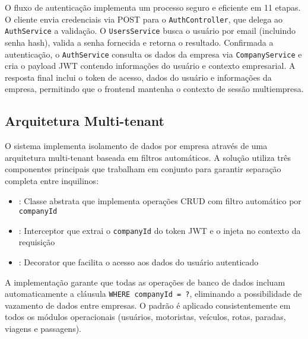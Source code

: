 O fluxo de autenticação implementa um processo seguro e eficiente em 11 etapas. O cliente envia credenciais via POST para o \texttt{AuthController}, que delega ao \texttt{AuthService} a validação. O \texttt{UsersService} busca o usuário por email (incluindo senha hash), valida a senha fornecida e retorna o resultado. Confirmada a autenticação, o \texttt{AuthService} consulta os dados da empresa via \texttt{CompanyService} e cria o payload JWT contendo informações do usuário e contexto empresarial. A resposta final inclui o token de acesso, dados do usuário e informações da empresa, permitindo que o frontend mantenha o contexto de sessão multiempresa.

\subsection{Arquitetura Multi-tenant}

O sistema implementa isolamento de dados por empresa através de uma arquitetura multi-tenant baseada em filtros automáticos. A solução utiliza três componentes principais que trabalham em conjunto para garantir separação completa entre inquilinos:

\begin{itemize}
  \item {}: Classe abstrata que implementa operações CRUD com filtro automático por \texttt{companyId}
  \item {}: Interceptor que extrai o \texttt{companyId} do token JWT e o injeta no contexto da requisição
  \item {}: Decorator que facilita o acesso aos dados do usuário autenticado
\end{itemize}

A implementação garante que todas as operações de banco de dados incluam automaticamente a cláusula \texttt{WHERE companyId = ?}, eliminando a possibilidade de vazamento de dados entre empresas. O padrão é aplicado consistentemente em todos os módulos operacionais (usuários, motoristas, veículos, rotas, paradas, viagens e passagens).

